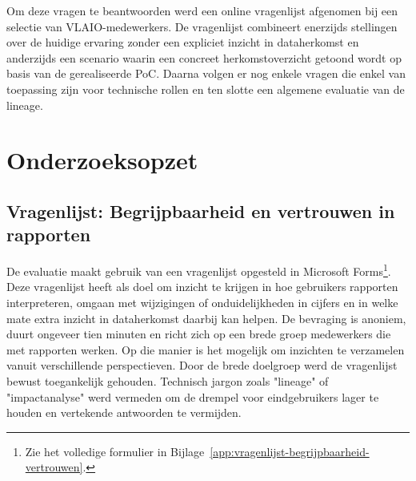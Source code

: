 Om deze vragen te beantwoorden werd een online vragenlijst afgenomen bij een selectie van VLAIO-medewerkers. De vragenlijst combineert enerzijds stellingen over de huidige ervaring zonder een expliciet inzicht in dataherkomst en anderzijds een scenario waarin een concreet herkomstoverzicht getoond wordt op basis van de gerealiseerde PoC. Daarna volgen er nog enkele vragen die enkel van toepassing zijn voor technische rollen en ten slotte een algemene evaluatie van de lineage.\\

\section{Onderzoeksopzet}

\subsection{Vragenlijst: Begrijpbaarheid en vertrouwen in rapporten}
De evaluatie maakt gebruik van een vragenlijst opgesteld in Microsoft Forms\footnote{Zie het volledige formulier in Bijlage~\ref{app:vragenlijst-begrijpbaarheid-vertrouwen}.}. Deze vragenlijst heeft als doel om inzicht te krijgen in hoe gebruikers rapporten interpreteren, omgaan met wijzigingen of onduidelijkheden in cijfers en in welke mate extra inzicht in dataherkomst daarbij kan helpen. De bevraging is anoniem, duurt ongeveer tien minuten en richt zich op een brede groep medewerkers die met rapporten werken. Op die manier is het mogelijk om inzichten te verzamelen vanuit verschillende perspectieven. Door de brede doelgroep werd de vragenlijst bewust toegankelijk gehouden. Technisch jargon zoals "lineage" of "impactanalyse" werd vermeden om de drempel voor eindgebruikers lager te houden en vertekende antwoorden te vermijden.\\

